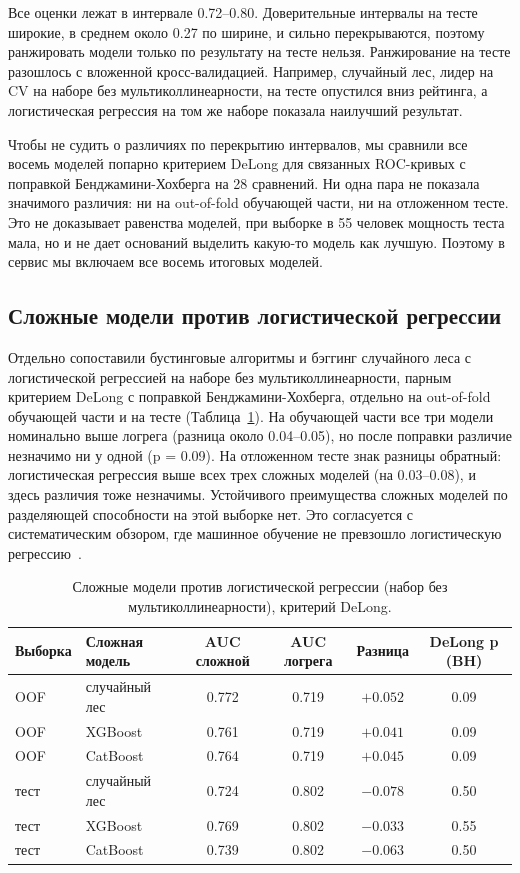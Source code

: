 \documentclass[12pt,a4paper]{article}
\begin{document}
Все оценки лежат в интервале 0.72--0.80. Доверительные интервалы на тесте широкие, в
среднем около 0.27 по ширине, и сильно перекрываются, поэтому ранжировать модели только по
результату на тесте нельзя. Ранжирование на тесте разошлось с вложенной кросс-валидацией.
Например, случайный лес, лидер на CV на наборе без мультиколлинеарности, на тесте опустился
вниз рейтинга, а логистическая регрессия на том же наборе показала наилучший результат.

Чтобы не судить о различиях по перекрытию интервалов, мы сравнили все восемь моделей
попарно критерием DeLong для связанных ROC-кривых с поправкой Бенджамини-Хохберга на 28
сравнений. Ни одна пара не показала значимого различия: ни на out-of-fold обучающей части,
ни на отложенном тесте. Это не доказывает равенства моделей, при выборке в 55 человек
мощность теста мала, но и не дает оснований выделить какую-то модель как лучшую. Поэтому в
сервис мы включаем все восемь итоговых моделей.

\subsection{Сложные модели против логистической регрессии}

Отдельно сопоставили бустинговые алгоритмы и бэггинг случайного леса с логистической
регрессией на наборе без мультиколлинеарности, парным критерием DeLong с поправкой
Бенджамини-Хохберга, отдельно на out-of-fold обучающей части и на тесте
(Таблица~\ref{tab:complex}). На обучающей части все три модели номинально выше логрега
(разница около 0.04--0.05), но после поправки различие незначимо ни у одной (p = 0.09). На
отложенном тесте знак разницы обратный: логистическая регрессия выше всех трех сложных
моделей (на 0.03--0.08), и здесь различия тоже незначимы. Устойчивого преимущества сложных
моделей по разделяющей способности на этой выборке нет. Это согласуется с систематическим
обзором, где машинное обучение не превзошло логистическую регрессию~\cite{ref17}.

\begin{table}[ht]
  \centering
  \caption{Сложные модели против логистической регрессии (набор без мультиколлинеарности), критерий DeLong.}
  \label{tab:complex}
  \small
  \begin{tabular}{l l c c c c}
    \toprule
    Выборка & Сложная модель & AUC сложной & AUC логрега & Разница & DeLong p (BH) \\
    \midrule
    OOF & случайный лес & 0.772 & 0.719 & $+0.052$ & 0.09 \\
    OOF & XGBoost & 0.761 & 0.719 & $+0.041$ & 0.09 \\
    OOF & CatBoost & 0.764 & 0.719 & $+0.045$ & 0.09 \\
    тест & случайный лес & 0.724 & 0.802 & $-0.078$ & 0.50 \\
    тест & XGBoost & 0.769 & 0.802 & $-0.033$ & 0.55 \\
    тест & CatBoost & 0.739 & 0.802 & $-0.063$ & 0.50 \\
    \bottomrule
  \end{tabular}
\end{table}
\end{document}
